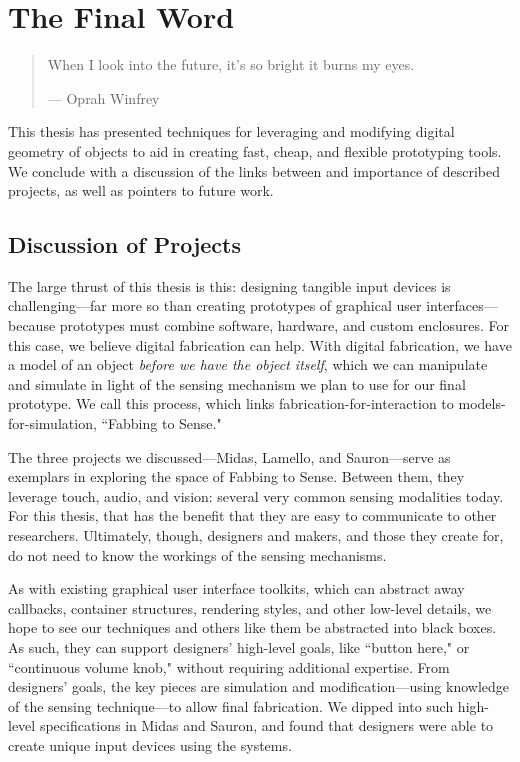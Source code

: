 \chapter{The Final Word}

\begin{quote}
When I look into the future, it's so bright it burns my eyes.

--- Oprah Winfrey
\end{quote}

This thesis has presented techniques for leveraging and modifying digital geometry of objects to aid in creating fast, cheap, and flexible prototyping tools. We conclude with a discussion of the links between and importance of described projects, as well as pointers to future work.

\section{Discussion of Projects}

The large thrust of this thesis is this: designing tangible input devices is challenging---far more so than creating prototypes of graphical user interfaces---because prototypes must combine software, hardware, and custom enclosures. For this case, we believe digital fabrication can help. With digital fabrication, we have a model of an object \emph{before we have the object itself}, which we can manipulate and simulate in light of the sensing mechanism we plan to use for our final prototype. We call this process, which links fabrication-for-interaction to models-for-simulation, ``Fabbing to Sense."

The three projects we discussed---Midas, Lamello, and Sauron---serve as exemplars in exploring the space of Fabbing to Sense. Between them, they leverage touch, audio, and vision: several very common sensing modalities today. For this thesis, that has the benefit that they are easy to communicate to other researchers. Ultimately, though, designers and makers, and those they create for, do not need to know the workings of the sensing mechanisms.

As with existing graphical user interface toolkits, which can abstract away callbacks, container structures, rendering styles, and other low-level details, we hope to see our techniques and others like them be abstracted into black boxes. As such, they can support designers' high-level goals, like ``button here," or ``continuous volume knob," without requiring additional expertise. From designers' goals, the key pieces are simulation and modification---using knowledge of the sensing technique---to allow final fabrication. We dipped into such high-level specifications in Midas and Sauron, and found that designers were able to create unique input devices using the systems.

